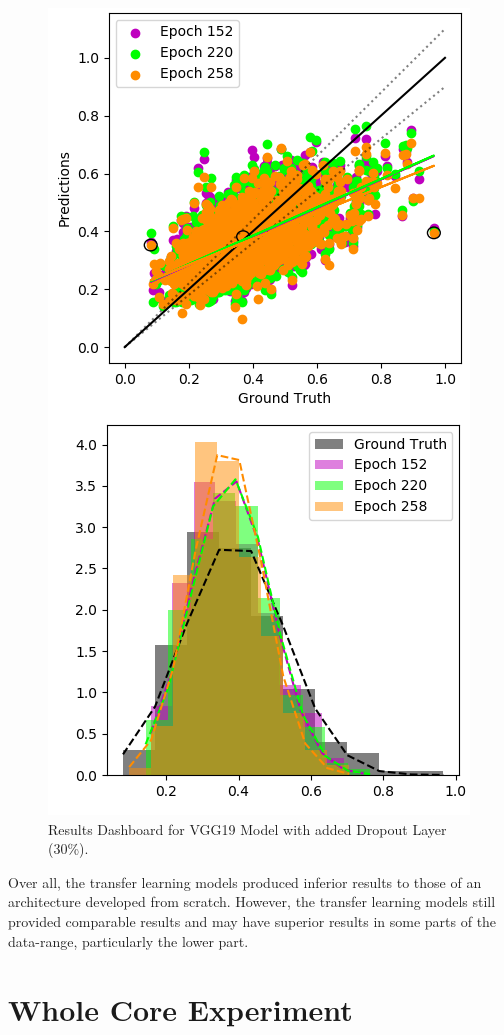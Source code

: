 \begin{figure}[p]
	\centering
	\includegraphics[scale=0.7]{Figures/transfer3.png}
	\caption{Results Dashboard for VGG19 Model with added Dropout Layer (30\%).}
	\label{fig:results_transfer}
\end{figure}

\noindent
Over all, the transfer learning models produced inferior results to those of an architecture developed from scratch. However, the transfer learning models still provided comparable results and may have superior results in some parts of the data-range, particularly the lower part.

\section{Whole Core Experiment} \label{prelim:whole}

